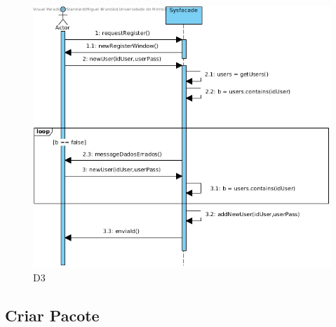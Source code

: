 \begin{figure}[H]
    \centering
    \includegraphics[width=\textwidth]{diagramas_de_sequencia/imgs/UserSystemUC3D3.jpg}
    \caption{D3}
\end{figure}

\subsection{Criar Pacote}

